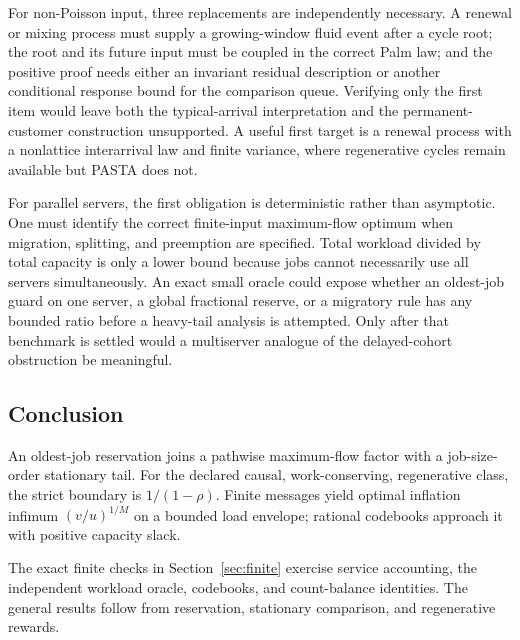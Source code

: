 For non-Poisson input, three replacements are independently necessary.  A renewal or mixing process must supply a growing-window fluid event after a cycle root; the root and its future input must be coupled in the correct Palm law; and the positive proof needs either an invariant residual description or another conditional response bound for the comparison queue.  Verifying only the first item would leave both the typical-arrival interpretation and the permanent-customer construction unsupported.  A useful first target is a renewal process with a nonlattice interarrival law and finite variance, where regenerative cycles remain available but PASTA does not.

For parallel servers, the first obligation is deterministic rather than asymptotic.  One must identify the correct finite-input maximum-flow optimum when migration, splitting, and preemption are specified.  Total workload divided by total capacity is only a lower bound because jobs cannot necessarily use all servers simultaneously.  An exact small oracle could expose whether an oldest-job guard on one server, a global fractional reserve, or a migratory rule has any bounded ratio before a heavy-tail analysis is attempted.  Only after that benchmark is settled would a multiserver analogue of the delayed-cohort obstruction be meaningful.

\subsection{Conclusion}
An oldest-job reservation joins a pathwise maximum-flow factor with a job-size-order stationary tail. For the declared causal, work-conserving, regenerative class, the strict boundary is $1/(1-\rho)$. Finite messages yield optimal inflation infimum $(v/u)^{1/M}$ on a bounded load envelope; rational codebooks approach it with positive capacity slack.

The exact finite checks in Section~\ref{sec:finite} exercise service accounting, the independent workload oracle, codebooks, and count-balance identities. The general results follow from reservation, stationary comparison, and regenerative rewards.
